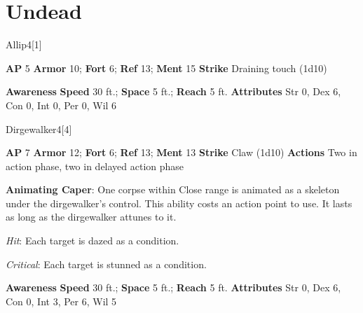 \section{Undead}
\begin{monsection}{Allip}{4}[1]
\vspace{-1em}\vspace{-1em}
\begin{spellcontent}
\begin{spelltargetinginfo}
{\textbf{AP} 5}
\pari \textbf{Armor} 10;
\textbf{Fort} 6;
\textbf{Ref} 13;
\textbf{Ment} 15
\pari \textbf{Strike} Draining touch  (1d10)
\end{spelltargetinginfo}
\end{spellcontent}
\begin{spellsubcontent}
\begin{spellfooter}
\pari \textbf{Awareness} 
\pari \textbf{Speed} 30 ft.;
\textbf{Space} 5 ft.;
\textbf{Reach} 5 ft.
\pari \textbf{Attributes}
Str 0,
Dex 6,
Con 0,
Int 0,
Per 0,
Wil 6
\end{spellfooter}
\end{spellsubcontent}
\end{monsection}
\begin{monsection}{Dirgewalker}{4}[4]
\vspace{-1em}\vspace{-1em}
\begin{spellcontent}
\begin{spelltargetinginfo}
{\textbf{AP} 7}
\pari \textbf{Armor} 12;
\textbf{Fort} 6;
\textbf{Ref} 13;
\textbf{Ment} 13
\pari \textbf{Strike} Claw  (1d10)
\pari \textbf{Actions} Two in action phase, two in delayed action phase
\end{spelltargetinginfo}
\begin{spelleffects}
\pari
\textbf{Animating Caper}:
One corpse within Close range is animated as a skeleton under the dirgewalker's control.
This ability costs an action point to use.
It lasts as long as the dirgewalker attunes to it.
\vspace{0.5em}
\pari
{}
\par
\par \textit{Hit}: Each target is dazed as a condition.
\par \textit{Critical}: Each target is stunned as a condition.
\end{spelleffects}
\end{spellcontent}
\begin{spellsubcontent}
\begin{spellfooter}
\pari \textbf{Awareness} 
\pari \textbf{Speed} 30 ft.;
\textbf{Space} 5 ft.;
\textbf{Reach} 5 ft.
\pari \textbf{Attributes}
Str 0,
Dex 6,
Con 0,
Int 3,
Per 6,
Wil 5
\end{spellfooter}
\end{spellsubcontent}
\end{monsection}
